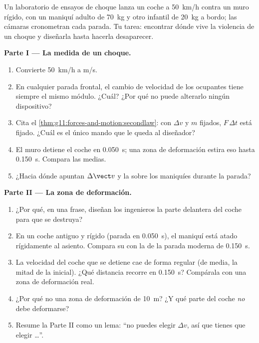 \begin{problem}
\label{pb:g11:forces-and-motion:1}
Un laboratorio de ensayos de choque lanza un coche a \qty{50}{km/h}
contra un muro rígido, con un maniquí adulto de \qty{70}{kg} y otro
infantil de \qty{20}{kg} a bordo; las cámaras cronometran cada parada.
Tu tarea: encontrar dónde vive la violencia de un choque y diseñarla
hasta hacerla desaparecer.

\medskip
\noindent\textbf{Parte I --- La medida de un choque.}
\begin{enumerate}
  \item Convierte \qty{50}{km/h} a \unit{m/s}.
  \item En cualquier parada frontal, el cambio de velocidad de los
        ocupantes tiene siempre el mismo módulo. ¿Cuál? ¿Por qué no
        puede alterarlo ningún dispositivo?
  \item Cita el \cref{thm:g11:forces-and-motion:secondlaw}: con
        $\Delta v$ y $m$ fijados, $F\,\Delta t$ está fijado. ¿Cuál es el
        único mando que le queda al diseñador?
  \item El muro detiene el coche en \qty{0.050}{s}; una zona de
        deformación estira eso hasta \qty{0.150}{s}. Compara las 
        medias.
  \item ¿Hacia dónde apuntan $\Delta \vect v$ y la  sobre los
        maniquíes durante la parada?
\end{enumerate}

\medskip
\noindent\textbf{Parte II --- La zona de deformación.}
\begin{enumerate}[resume]
  \item ¿Por qué, en una frase, diseñan los ingenieros la parte
        delantera del coche para que se destruya?
  \item En un coche antiguo y rígido (parada en \qty{0.050}{s}), el
        maniquí está atado rígidamente al asiento. Compara su  con
        la de la parada moderna de \qty{0.150}{s}.
  \item La velocidad del coche que se detiene cae de forma regular (de
        media, la mitad de la inicial). ¿Qué distancia recorre en
        \qty{0.150}{s}? Compárala con una zona de deformación real.
  \item ¿Por qué no una zona de deformación de \qty{10}{m}? ¿Y qué parte
        del coche \emph{no} debe deformarse?
  \item Resume la Parte II como un lema: ``no puedes elegir $\Delta v$,
        así que tienes que elegir \dots''.
\end{enumerate}


\end{problem}
